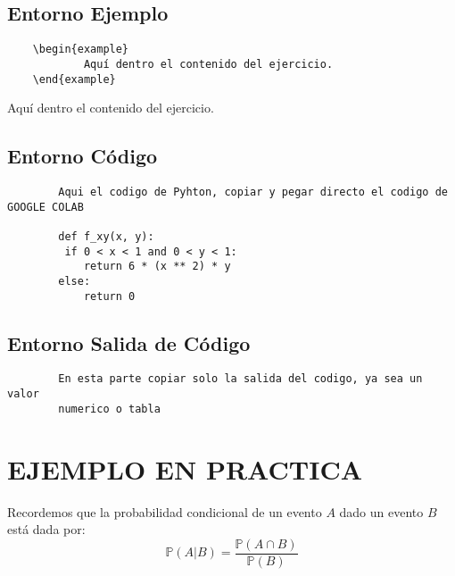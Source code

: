 \documentclass[a4paper,12pt]{article}
\begin{document}
    \subsection*{Entorno Ejemplo}
    \begin{verbatim}
    \begin{example}
            Aquí dentro el contenido del ejercicio.
    \end{example}
    \end{verbatim}
        \begin{example}
            Aquí dentro el contenido del ejercicio.
        \end{example}

    \subsection*{Entorno Código}
        \begin{lstlisting}
        Aqui el codigo de Pyhton, copiar y pegar directo el codigo de GOOGLE COLAB
        
        def f_xy(x, y):
         if 0 < x < 1 and 0 < y < 1:
            return 6 * (x ** 2) * y
        else:
            return 0
        \end{lstlisting}

    \subsection*{Entorno Salida de Código}
        \begin{verbatim}
        En esta parte copiar solo la salida del codigo, ya sea un valor
        numerico o tabla
        \end{verbatim}



\section{EJEMPLO EN PRACTICA}
Recordemos que la probabilidad condicional de un evento $A$ dado un evento $B$ está dada por:
\begin{equation*}
    \mathbb{P}(A | B ) = \dfrac{\mathbb{P}(A \cap B )}{\mathbb{P}(B)}
\end{equation*}
\end{document}
